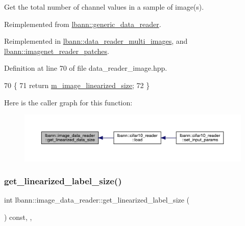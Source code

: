 Get the total number of channel values in a sample of image(s). 



Reimplemented from \hyperlink{classlbann_1_1generic__data__reader_a246a719477c8c7b6122d41b6f5618d41}{lbann\+::generic\+\_\+data\+\_\+reader}.



Reimplemented in \hyperlink{classlbann_1_1data__reader__multi__images_a63d7c8f0b674f19840134ee99680f3fc}{lbann\+::data\+\_\+reader\+\_\+multi\+\_\+images}, and \hyperlink{classlbann_1_1imagenet__reader__patches_a09ce692ca31d52424dea5395ad6c8b2b}{lbann\+::imagenet\+\_\+reader\+\_\+patches}.



Definition at line 70 of file data\+\_\+reader\+\_\+image.\+hpp.


\begin{DoxyCode}
70                                                 \{
71     \textcolor{keywordflow}{return} \hyperlink{classlbann_1_1image__data__reader_af512f1f866c0f654309b7f28886dca9a}{m\_image\_linearized\_size};
72   \}
\end{DoxyCode}
Here is the caller graph for this function\+:\nopagebreak
\begin{figure}[H]
\begin{center}
\leavevmode
\includegraphics[width=350pt]{classlbann_1_1image__data__reader_a26b8566e76ba99c017a84c49a9dec37c_icgraph}
\end{center}
\end{figure}
\mbox{\label{classlbann_1_1image__data__reader_adb62b193a10b2b12c1bf183ea9c2095e}} 
\subsubsection{\texorpdfstring{get\+\_\+linearized\+\_\+label\+\_\+size()}{get\_linearized\_label\_size()}}
{\footnotesize\ttfamily int lbann\+::image\+\_\+data\+\_\+reader\+::get\+\_\+linearized\+\_\+label\+\_\+size (\begin{DoxyParamCaption}{ }\end{DoxyParamCaption}) const\hspace{0.3cm}{\ttfamily [inline]}, {\ttfamily [override]}, {\ttfamily [virtual]}}




